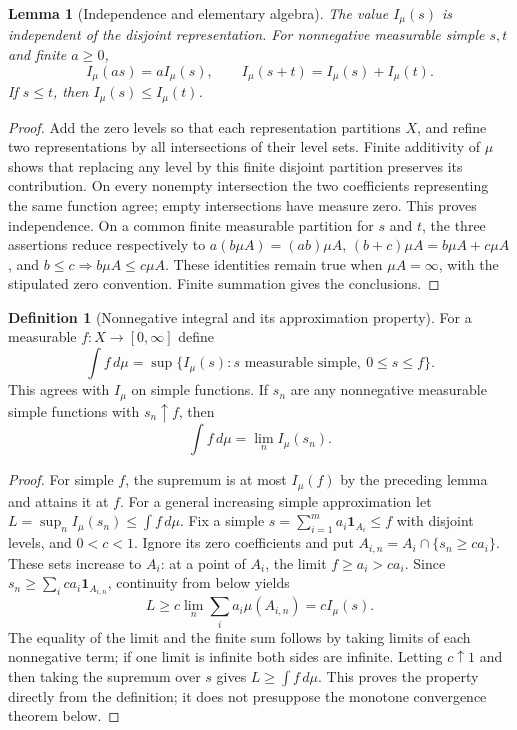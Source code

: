 \documentclass[11pt,oneside,openany]{book}
\newtheorem{lemma}[theorem]{Lemma}
\theoremstyle{definition}
\newtheorem{definition}[theorem]{Definition}
\theoremstyle{remark}
\newcommand{\one}{\mathbf1}\newcommand{\ind}[1]{\mathbf1_{#1}}
\newcommand{\Eplus}{[0,\infty]}
\newcommand{\family}[1]{}
\begin{document}
\begin{lemma}[Independence and elementary algebra]
\family{D11.05.simple_integral_well_defined}\label{d11:05:simple-integral-well-defined}
The value $I_\mu(s)$ is independent of the disjoint representation.
For nonnegative measurable simple $s,t$ and finite $a\geq0$,
\[
 I_\mu(as)=aI_\mu(s),\qquad I_\mu(s+t)=I_\mu(s)+I_\mu(t).
\]
If $s\leq t$, then $I_\mu(s)\leq I_\mu(t)$.
\end{lemma}
\begin{proof}
Add the zero levels so that each representation partitions $X$, and refine
two representations by all intersections of their level sets. Finite
additivity of $\mu$ shows that replacing any level by this finite disjoint
partition preserves its contribution. On every nonempty intersection the two
coefficients representing the same function agree; empty intersections have
measure zero. This proves independence. On a common finite measurable
partition for $s$ and $t$, the three assertions reduce respectively to
$a(b\mu A)=(ab)\mu A$, $(b+c)\mu A=b\mu A+c\mu A$, and
$b\leq c\Rightarrow b\mu A\leq c\mu A$. These identities remain true when
$\mu A=\infty$, with the stipulated zero convention. Finite summation gives
the conclusions.
\end{proof}

\begin{definition}[Nonnegative integral and its approximation property]
\family{D11.05.nonnegative_integral}\label{d11:05:nonnegative-integral}
For a measurable $f:X\to\Eplus$ define
\[
 \int f\,d\mu=\sup\{I_\mu(s):s\text{ measurable simple},\ 0\leq s\leq f\}.
\]
This agrees with $I_\mu$ on simple functions. If $s_n$ are any nonnegative
measurable simple functions with $s_n\uparrow f$, then
\[
 \int f\,d\mu=\lim_n I_\mu(s_n).
\]
\end{definition}
\begin{proof}
For simple $f$, the supremum is at most $I_\mu(f)$ by the preceding lemma
and attains it at $f$. For a general increasing simple approximation let
$L=\sup_n I_\mu(s_n)\leq\int f\,d\mu$. Fix a simple
$s=\sum_{i=1}^m a_i\one_{A_i}\leq f$ with disjoint levels, and $0<c<1$.
Ignore its zero coefficients and put
$A_{i,n}=A_i\cap\{s_n\geq ca_i\}$. These sets increase to $A_i$:
at a point of $A_i$, the limit $f\geq a_i>ca_i$.
Since $s_n\geq\sum_i ca_i\one_{A_{i,n}}$, continuity from below yields
\[
 L\geq c\lim_n\sum_i a_i\mu(A_{i,n})=cI_\mu(s).
\]
The equality of the limit and the finite sum follows by taking limits of
each nonnegative term; if one limit is infinite both sides are infinite.
Letting $c\uparrow1$ and then taking the supremum over $s$ gives
$L\geq\int f\,d\mu$. This proves the property directly from the definition;
it does not presuppose the monotone convergence theorem below.
\end{proof}
\end{document}
